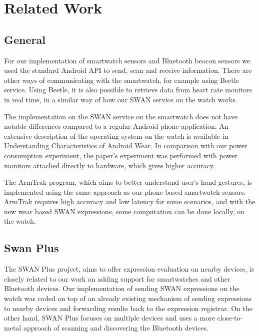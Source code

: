 
\chapter{Related Work} %

\label{Chapter2} %



\section{General}
For our implementation of smartwatch sensors and Bluetooth beacon sensors we used the standard Android API to send, scan and receive information.
There are other ways of communicating with the smartwatch, for example using Beetle\cite{beetle_mobisys16} service.
Using Beetle, it is also possible to retrieve data from heart rate monitors in real time, in a similar way of how our SWAN service on the watch works.

The implementation on the SWAN service on the smartwatch does not have notable differences compared to a regular Android phone application.
An extensive description of the operating system on the watch is available  in Understanding Characteristics of Android Wear\cite{android_wear_char}.
In comparison with our power consumption experiment, the paper's experiment was performed  with power monitors attached 
directly to hardware, which gives higher accuracy.

The ArmTrak\cite{arm_trak} program, which aims to better understand user's hand gestures, is implemented using the same approach as our phone based 
smartwatch sensors. ArmTrak requires high accuracy and low latency for some scenarios, and with the new wear based SWAN expressions, some computation can be
done locally, on the watch.

\section{Swan Plus}
The SWAN Plus\cite{swan_plus} project,  aims to offer expression evaluation on nearby devices, is closely related to our work on adding support for smartwatches and other Bluetooth devices.
Our implementation of sending SWAN expressions on the watch was coded on top of an already existing mechanism of sending expressions to nearby devices and forwarding results back to the expression
registrar. On the other hand, SWAN Plus focuses on multiple devices and uses a more close-to-metal approach of scanning and discovering the Bluetooth devices.


